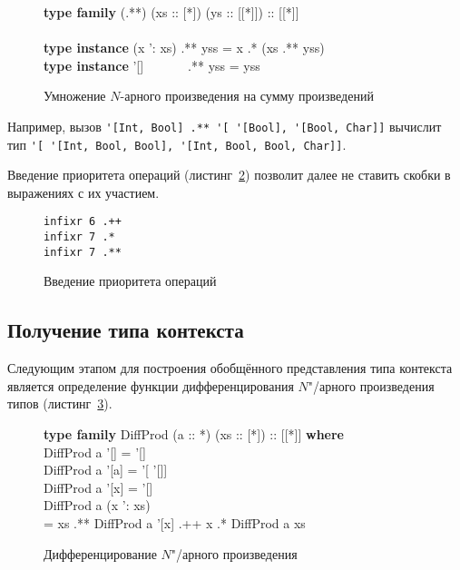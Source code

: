 \begin{figure}[h]
\begin{framed}
\ttfamily\small
\textbf{type family} (.**) (xs :: [*]) (ys :: [[*]]) :: [[*]]\\
\\
\textbf{type instance} (x ': xs) .** yss = x .* (xs .** yss)\\
\textbf{type instance} '[]~~~~~~~.** yss = yss
\end{framed}
\caption{Умножение $N$-арного произведения на сумму произведений}
\label{list:prod-mult}
\end{figure}

Например, вызов \lstinline{'[Int, Bool] .** '[ '[Bool], '[Bool, Char]]} вычислит тип \lstinline{'[ '[Int, Bool, Bool], '[Int, Bool, Bool, Char]]}.

Введение приоритета операций (листинг~\ref{list:priority}) позволит далее не ставить скобки в выражениях с их участием.
\begin{figure}[h]
\begin{framed}
\vspace{-0.25cm}
\begin{lstlisting}
infixr 6 .++
infixr 7 .*
infixr 7 .**
\end{lstlisting}
\vspace{-0.25cm}
\end{framed}
\caption{Введение приоритета операций}
\label{list:priority}
\end{figure}

\subsection{Получение типа контекста}

Следующим этапом для построения обобщённого представления типа контекста является определение функции дифференцирования $N$"/арного произведения типов (листинг~\ref{list:diff-prod}).
\begin{figure}[h]
\begin{framed}
\ttfamily\small
\textbf{type family} DiffProd (a :: *) (xs :: [*]) :: [[*]] \textbf{where}\\
\ind DiffProd a '[]  = '[]\\
\ind DiffProd a '[a] = '[ '[]]\\
\ind DiffProd a '[x] = '[]\\
\ind DiffProd a (x ': xs)\\
\ind\ind = xs .** DiffProd a '[x] .++ x .* DiffProd a xs
\end{framed}
\caption{Дифференцирование $N$"/арного произведения}
\label{list:diff-prod}
\end{figure}

